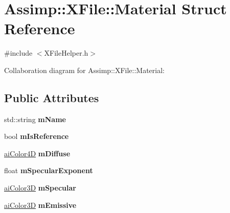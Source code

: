 \hypertarget{struct_assimp_1_1_x_file_1_1_material}{\section{Assimp\+:\+:X\+File\+:\+:Material Struct Reference}
\label{struct_assimp_1_1_x_file_1_1_material}
}


{\ttfamily \#include $<$X\+File\+Helper.\+h$>$}



Collaboration diagram for Assimp\+:\+:X\+File\+:\+:Material\+:
\subsection*{Public Attributes}
\begin{DoxyCompactItemize}
\item 
\hypertarget{struct_assimp_1_1_x_file_1_1_material_ad7d1a224a8950fc395e0b7dadc088d6e}{std\+::string {\bfseries m\+Name}}\label{struct_assimp_1_1_x_file_1_1_material_ad7d1a224a8950fc395e0b7dadc088d6e}

\item 
\hypertarget{struct_assimp_1_1_x_file_1_1_material_a29862fc05e3bb700940673e3dbbbf5ca}{bool {\bfseries m\+Is\+Reference}}\label{struct_assimp_1_1_x_file_1_1_material_a29862fc05e3bb700940673e3dbbbf5ca}

\item 
\hypertarget{struct_assimp_1_1_x_file_1_1_material_adb5e204b4be9dd24647374b54c6a6fdd}{\hyperlink{structai_color4_d}{ai\+Color4\+D} {\bfseries m\+Diffuse}}\label{struct_assimp_1_1_x_file_1_1_material_adb5e204b4be9dd24647374b54c6a6fdd}

\item 
\hypertarget{struct_assimp_1_1_x_file_1_1_material_aff5d25431619760b695d977f5a42b909}{float {\bfseries m\+Specular\+Exponent}}\label{struct_assimp_1_1_x_file_1_1_material_aff5d25431619760b695d977f5a42b909}

\item 
\hypertarget{struct_assimp_1_1_x_file_1_1_material_ade83873cb33eb0b6754bc4e291fa7325}{\hyperlink{structai_color3_d}{ai\+Color3\+D} {\bfseries m\+Specular}}\label{struct_assimp_1_1_x_file_1_1_material_ade83873cb33eb0b6754bc4e291fa7325}

\item 
\hypertarget{struct_assimp_1_1_x_file_1_1_material_a402362e59dce38deafbbe3a838c21dd9}{\hyperlink{structai_color3_d}{ai\+Color3\+D} {\bfseries m\+Emissive}}\label{struct_assimp_1_1_x_file_1_1_material_a402362e59dce38deafbbe3a838c21dd9}


\end{DoxyCompactItemize}
